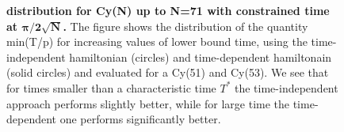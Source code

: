 \begin{figure}[ht]
  \centering
  \caption[$\tau$ distribution for Cy(N) up to N=71 with constrained time at $\pi/2\sqrt(N)$.]{\textbf{\bm{$\tau$} distribution for Cy(N) up to N=71 with constrained time at $\bm{\pi/2\sqrt{N}}$.} The figure shows the distribution of the quantity min(T/p) for increasing values of lower bound time, using the time-independent hamiltonian (circles) and time-dependent hamiltonain (solid circles) and evaluated for a Cy(51) and Cy(53). We see that for times smaller than a characteristic time $T^*$ the time-independent approach performs slightly better, while for large time the time-dependent one performs significantly better. }
  \label{fig:delta_increasing_time}
\end{figure}
